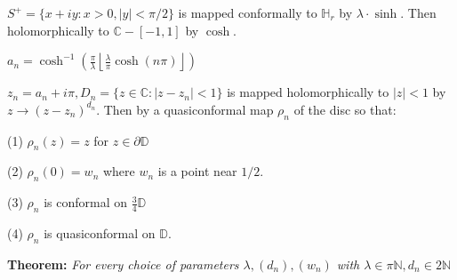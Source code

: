 \documentclass{beamer}
\begin{document}
\begin{frame} 

{\tiny $S^+ = \{ x + iy : x > 0, |y| < \pi/2 \}$ is mapped conformally to $\mathbb{H}_r$ by $\lambda\cdot\sinh$. Then holomorphically to $\mathbb{C} - [-1,1]$ by $\cosh$.

\vspace{2.5mm}

$a_n = \cosh^{-1}\left( \frac{\pi}{\lambda} \left \lfloor{ \frac{\lambda}{\pi} \cosh(n\pi) }\right \rfloor \right)$

\vspace{2.5mm}

$z_n = a_n + i\pi, D_n = \{ z \in \mathbb{C} : \left| z - z_n \right| < 1\} $ is mapped holomorphically to $|z|<1$ by $z\rightarrow (z - z_n)^{d_n}$. Then by a quasiconformal map $\rho_n$ of the disc so that: 

\hspace{5mm} (1) $\rho_n(z)=z$ for $z\in\partial\mathbb{D}$

\hspace{5mm} (2) $\rho_n(0)=w_n$ where $w_n$ is a point near $1/2$.

\hspace{5mm} (3) $\rho_n$ is conformal on $\frac{3}{4}\mathbb{D}$

\hspace{5mm} (4) $\rho_n$ is quasiconformal on $\mathbb{D}$.  

}

\vspace{5mm}

{\bf Theorem:}  {\it For every choice of parameters $\lambda, (d_n), (w_n)$ with $\lambda \in \pi\mathbb{N}, d_n \in 2\mathbb{N}$}


\end{frame}
\end{document}
